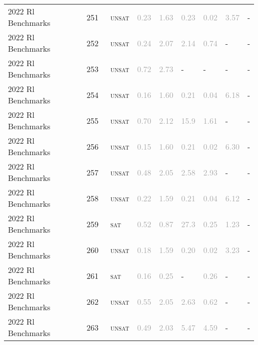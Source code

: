 \begin{center}
{\begin{longtable}{@{}lllllllll@{}}
2022 Rl Benchmarks & 251 & ~\textsc{unsat} & \textcolor{darkgray}{0.23} & \textcolor{darkgray}{1.63} & \textcolor{darkgray}{0.23} & \textcolor{darkgray}{0.02} & \textcolor{darkgray}{3.57} & - \\
2022 Rl Benchmarks & 252 & ~\textsc{unsat} & \textcolor{darkgray}{0.24} & \textcolor{darkgray}{2.07} & \textcolor{darkgray}{2.14} & \textcolor{darkgray}{0.74} & - & - \\
2022 Rl Benchmarks & 253 & ~\textsc{unsat} & \textcolor{darkgray}{0.72} & \textcolor{darkgray}{2.73} & - & - & - & - \\
2022 Rl Benchmarks & 254 & ~\textsc{unsat} & \textcolor{darkgray}{0.16} & \textcolor{darkgray}{1.60} & \textcolor{darkgray}{0.21} & \textcolor{darkgray}{0.04} & \textcolor{darkgray}{6.18} & - \\
2022 Rl Benchmarks & 255 & ~\textsc{unsat} & \textcolor{darkgray}{0.70} & \textcolor{darkgray}{2.12} & \textcolor{darkgray}{15.9} & \textcolor{darkgray}{1.61} & - & - \\
2022 Rl Benchmarks & 256 & ~\textsc{unsat} & \textcolor{darkgray}{0.15} & \textcolor{darkgray}{1.60} & \textcolor{darkgray}{0.21} & \textcolor{darkgray}{0.02} & \textcolor{darkgray}{6.30} & - \\
2022 Rl Benchmarks & 257 & ~\textsc{unsat} & \textcolor{darkgray}{0.48} & \textcolor{darkgray}{2.05} & \textcolor{darkgray}{2.58} & \textcolor{darkgray}{2.93} & - & - \\
2022 Rl Benchmarks & 258 & ~\textsc{unsat} & \textcolor{darkgray}{0.22} & \textcolor{darkgray}{1.59} & \textcolor{darkgray}{0.21} & \textcolor{darkgray}{0.04} & \textcolor{darkgray}{6.12} & - \\
2022 Rl Benchmarks & 259 & ~\textsc{sat} & \textcolor{darkgray}{0.52} & \textcolor{darkgray}{0.87} & \textcolor{darkgray}{27.3} & \textcolor{darkgray}{0.25} & \textcolor{darkgray}{1.23} & - \\
2022 Rl Benchmarks & 260 & ~\textsc{unsat} & \textcolor{darkgray}{0.18} & \textcolor{darkgray}{1.59} & \textcolor{darkgray}{0.20} & \textcolor{darkgray}{0.02} & \textcolor{darkgray}{3.23} & - \\
2022 Rl Benchmarks & 261 & ~\textsc{sat} & \textcolor{darkgray}{0.16} & \textcolor{darkgray}{0.25} & - & \textcolor{darkgray}{0.26} & - & - \\
2022 Rl Benchmarks & 262 & ~\textsc{unsat} & \textcolor{darkgray}{0.55} & \textcolor{darkgray}{2.05} & \textcolor{darkgray}{2.63} & \textcolor{darkgray}{0.62} & - & - \\
2022 Rl Benchmarks & 263 & ~\textsc{unsat} & \textcolor{darkgray}{0.49} & \textcolor{darkgray}{2.03} & \textcolor{darkgray}{5.47} & \textcolor{darkgray}{4.59} & - & - \\

\end{longtable}}
\end{center}
